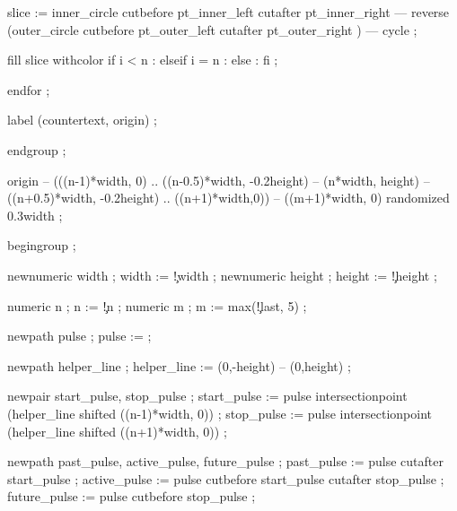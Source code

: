     slice := inner_circle cutbefore pt_inner_left cutafter pt_inner_right 
       --- reverse (outer_circle cutbefore pt_outer_left cutafter pt_outer_right ) 
       --- cycle ;

    fill slice withcolor 
      if i < n     :  
      elseif i = n : 
      else         : 
      fi ;

  endfor ;

  label (countertext, origin) ;

  endgroup ;

\stopuseMPgraphic



   origin -- (((n-1)*width, 0) .. ((n-0.5)*width, -0.2height) 
		  -- (n*width, height) -- ((n+0.5)*width, -0.2height) 
		  .. ((n+1)*width,0))  -- ((m+1)*width, 0) 
		  randomized 0.3width ;
\stopuseMPgraphic 


  begingroup ;

  newnumeric width  ; width  := \visualcounterparameter\c!width ;
  newnumeric height ; height := \visualcounterparameter\c!height ;

  numeric n ; n := \visualcounterparameter\c!n ;
  numeric m ; m := max(\visualcounterparameter\c!last, 5) ;


  newpath pulse ;
  pulse :=  ;

  newpath helper_line ;
  helper_line := (0,-height) -- (0,height) ;

  newpair start_pulse, stop_pulse ;
  start_pulse := pulse intersectionpoint (helper_line shifted ((n-1)*width, 0)) ;
  stop_pulse  := pulse intersectionpoint (helper_line shifted ((n+1)*width, 0)) ;

  
  newpath past_pulse, active_pulse, future_pulse ;
  past_pulse    := pulse cutafter start_pulse ;
  active_pulse  := pulse cutbefore start_pulse cutafter stop_pulse ;
  future_pulse  := pulse cutbefore stop_pulse ;

